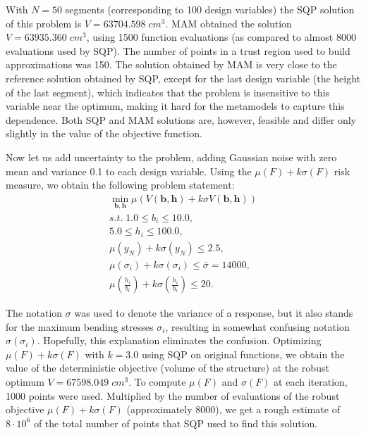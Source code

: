 \documentclass{llncs}
\begin{document}
With $N=50$ segments (corresponding to 100 design variables) the SQP solution of this problem is $V = 63704.598\; cm^3$. MAM obtained the solution $V = 63935.360\; cm^3$, using 1500 function evaluations (as compared to almost 8000 evaluations used by SQP). The number of points in a trust region used to build approximations was 150. The solution obtained by MAM is very close to the reference solution obtained by SQP, except for the last design variable (the height of the last segment), which indicates that the problem is insensitive to this variable near the optimum, making it hard for the metamodels to capture this dependence. Both SQP and MAM solutions are, however, feasible and differ only slightly in the value of the objective function.

Now let us add uncertainty to the problem, adding Gaussian noise with zero mean and variance 0.1 to each design variable. Using the $\mu(F) + k\sigma(F)$ risk measure, we obtain the following problem statement:
\begin{displaymath}
  \begin{array}{c}
    \min\limits_{\boldsymbol b, \boldsymbol h}\mu(V(\boldsymbol b, \boldsymbol h) + k\sigma V(\boldsymbol b, \boldsymbol h)) \\
    s.t.\;1.0\le b_i \le 10.0, \\
    5.0 \le h_i \le 100.0, \\
    \mu(y_N) + k\sigma(y_N)\le 2.5, \\
    \mu(\sigma_i)+k\sigma(\sigma_i)\le \bar{\sigma}=14000, \\
    \mu(\frac{h_i}{b_i})+k\sigma(\frac{h_i}{b_i})\le 20.
  \end{array}
\end{displaymath}

The notation $\sigma$ was used to denote the variance of a response, but it also stands for the maximum bending stresses $\sigma_i$, resulting in somewhat confusing notation $\sigma(\sigma_i )$. Hopefully, this explanation eliminates the confusion. Optimizing $\mu(F) + k\sigma(F)$ with $k = 3.0$ using SQP on original functions, we obtain the value of the deterministic objective (volume of the structure) at the robust optimum $V = 67598.049\; cm^3$. To compute $\mu(F)$ and $\sigma(F)$ at each iteration, 1000 points were used. Multiplied by the number of evaluations of the robust objective $\mu(F) + k\sigma(F)$ (approximately 8000), we get a rough estimate of $8\cdot 10^6$ of the total number of points that SQP used to find this solution.
\end{document}
